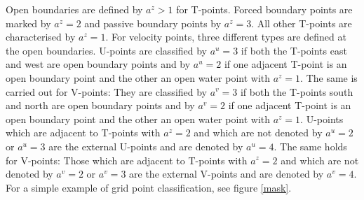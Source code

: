 Open boundaries are defined by $a^z>1$ for T-points.
Forced boundary points are marked by $a^z=2$ and passive
boundary points by $a^z=3$. 
All other T-points are characterised by $a^z=1$. 
For velocity points, three different types are defined at the
open boundaries. U-points are classified by $a^u=3$ if both 
the T-points east and west are open boundary points and by $a^u=2$
if one adjacent T-point is an open boundary point and the other 
an open water point with $a^z=1$. The same
is carried out for V-points: They are classified by $a^v=3$ if both
the T-points south and north are open boundary points and by $a^v=2$
if one adjacent T-point is an open boundary point
and the other an open water point with $a^z=1$.
U-points which are adjacent to T-points with $a^z=2$ and
which are not denoted by $a^u=2$ or $a^u=3$ are the external U-points
and are denoted by $a^u=4$. The same holds for V-points:
Those which are adjacent to T-points with $a^z=2$ and
which are not denoted by $a^v=2$ or $a^v=3$ are the external V-points
and are denoted by $a^v=4$.
For a simple example of grid point classification, see figure 
\ref{mask}.

